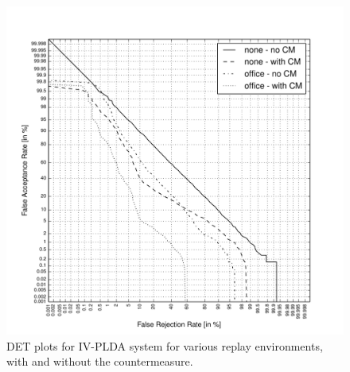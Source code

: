 \begin{figure}
	\centering
\includegraphics[width=1\linewidth]{Figs/DET_IVPLDA_counter_vil3_iPad.pdf}
	\caption{DET plots for IV-PLDA system for various replay environments, with and without the countermeasure.}
	\label{fig::DETs_CM}
\end{figure}


